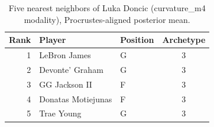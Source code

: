 \begin{table}[htbp]
  \centering\small
  \begin{tabular}{rllc}
    \toprule
    Rank & Player & Position & Archetype \\
    \midrule
    1 & LeBron James & G & 3 \\
    2 & Devonte' Graham & G & 3 \\
    3 & GG Jackson II & F & 3 \\
    4 & Donatas Motiejunas & F & 3 \\
    5 & Trae Young & G & 3 \\
    \bottomrule
  \end{tabular}
  \caption{Five nearest neighbors of Luka Doncic (curvature_m4 modality), Procrustes-aligned posterior mean.}
  \label{tab:Luka_Doncic_neighbors_curvature_m4}
\end{table}

